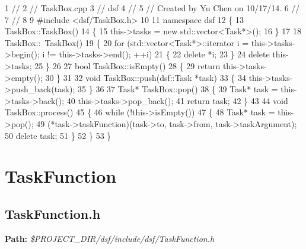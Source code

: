 \begin{DoxyCodeInclude}
1 \textcolor{comment}{//}
2 \textcolor{comment}{//  TaskBox.cpp}
3 \textcolor{comment}{//  dsf}
4 \textcolor{comment}{//}
5 \textcolor{comment}{//  Created by Yu Chen on 10/17/14.}
6 \textcolor{comment}{//}
7 \textcolor{comment}{//}
8 
9 \textcolor{preprocessor}{#include <dsf/TaskBox.h>}
10 
11 \textcolor{keyword}{namespace }dsf
12 \{
13     TaskBox::TaskBox()
14     \{
15         this->tasks = \textcolor{keyword}{new} std::vector<Task*>();
16     \}
17     
18     TaskBox::~TaskBox()
19     \{
20         \textcolor{keywordflow}{for} (std::vector<Task*>::iterator i = this->tasks->begin(); i != this->tasks->end(); ++i)
21         \{
22             \textcolor{keyword}{delete} *i;
23         \}
24         \textcolor{keyword}{delete} this->tasks;
25     \}
26     
27     \textcolor{keywordtype}{bool} TaskBox::isEmpty()
28     \{
29         \textcolor{keywordflow}{return} this->tasks->empty();
30     \}
31     
32     \textcolor{keywordtype}{void} TaskBox::push(dsf::Task *task)
33     \{
34         this->tasks->push\_back(task);
35     \}
36     
37     Task* TaskBox::pop()
38     \{
39         Task* task = this->tasks->back();
40         this->tasks->pop\_back();
41         \textcolor{keywordflow}{return} task;
42     \}
43     
44     \textcolor{keywordtype}{void} TaskBox::process()
45     \{
46         \textcolor{keywordflow}{while} (!this->isEmpty())
47         \{
48             Task* task = this->pop();
49             (*task->taskFunction)(task->to, task->from, task->taskArgument);
50             \textcolor{keyword}{delete} task;
51         \}
52     \}
53 \}
\end{DoxyCodeInclude}
 \hypertarget{_dual_state_framework_DualStateFrameworkTaskFunction}{}\section{Task\+Function}\label{_dual_state_framework_DualStateFrameworkTaskFunction}
\hypertarget{_dual_state_framework_DualStateFrameworkTaskFunction_h}{}\subsection{Task\+Function.\+h}\label{_dual_state_framework_DualStateFrameworkTaskFunction_h}
{\bfseries Path\+:} {\itshape \$\+P\+R\+O\+J\+E\+C\+T\+\_\+\+D\+I\+R/dsf/include/dsf/\+Task\+Function.h} 
